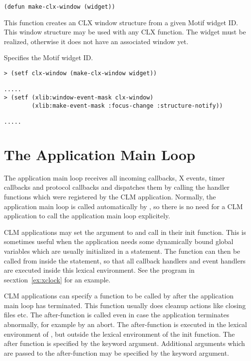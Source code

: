 \begin{lispd}
\syntax\begin{verbatim}
(defun make-clx-window (widget))
\end{verbatim}
\beschr This function creates an CLX window structure from a given Motif widget
ID. This window structure may be used with any CLX function. The widget must
be realized, otherwise it does not have an associated window yet.
\parameter
\begin{paramd}
 Specifies the Motif widget ID.
\end{paramd}
\beispiel\begin{verbatim}
> (setf clx-window (make-clx-window widget))

.....
> (setf (xlib:window-event-mask clx-window)
        (xlib:make-event-mask :focus-change :structure-notify))

.....
\end{verbatim}
\end{lispd}

\section{The Application Main Loop}

The application main loop receives all incoming callbacks, X events,
timer callbacks and protocol callbacks and dispatches them by calling the
handler functions which were registered by the CLM application.  Normally, the
application main loop is called automatically by ,
so there is no need for a CLM application to call the application main loop
explicitely. 

CLM applications may set the  argument to  and
call  in their init function.  This is sometimes useful when
the application needs some dynamically bound global variables which are usually
initialized in a  statement.  The  function can
then be called from inside the  statement, so that all callback
handlers and event handlers are executed inside this lexical environment.  See
the  program in secxtion~\ref{ex:xclock} for an example. 

CLM applications can specify a function to be called by
 after the application main loop has terminated. 
This function usually does cleanup actions like closing files etc.  The
after-function is called even in case the application terminates abnormally, for
example by an abort.  The after-function is executed in the lexical environment
of , but outside the lexical environment of the init
function.  The after function is specified by the  keyword
argument.  Additional arguments which are passed to the after-function may be
specified by the  keyword argument. 

